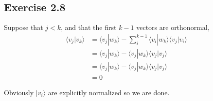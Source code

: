 \documentclass[]{article}
\begin{document}
\subsection{Exercise 2.8}

Suppose that $j < k$, and that the first $k-1$ vectors are orthonormal,
\begin{align*}
\langle v_j| v_k\rangle
&= \langle v_j|w_k\rangle - \sum_i^{k-1}\langle v_i | w_k\rangle \langle v_j|v_i\rangle \\
&= \langle v_j|w_k\rangle - \langle v_j | w_k\rangle \langle v_j|v_j\rangle \\
&= \langle v_j|w_k\rangle - \langle v_j | w_k\rangle \langle v_j|v_j\rangle \\
&= 0
\end{align*}

Obviously $|v_i\rangle$ are explicitly normalized so we are done.
\end{document}
